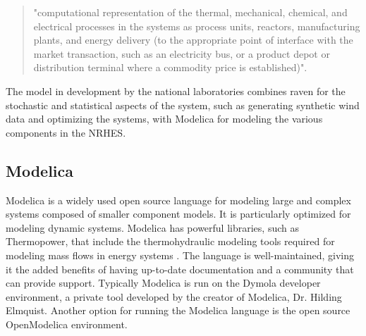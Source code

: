 \documentclass[12pt]{UIdahoMastersThesis}
\begin{document}
\begin{quotation}

"computational representation of the thermal, mechanical, chemical, and electrical processes in the systems as process units, reactors, manufacturing plants, and energy delivery (to the appropriate point of interface with the market transaction, such as an electricity bus, or a product depot or distribution terminal where a commodity price is established)"\cite{Rabiti2015}.
\end{quotation}

The model in development by the national laboratories combines \ac{raven} for the stochastic and statistical aspects of the system, such as generating synthetic wind data and optimizing the systems, with Modelica for modeling the various components in the NRHES.

\subsection{Modelica}
Modelica is a widely used open source language for modeling large and complex systems composed of smaller component models. It is particularly optimized for modeling dynamic systems. Modelica has powerful libraries, such as Thermopower, that include the thermohydraulic modeling tools required for modeling mass flows in energy systems \cite{Binder2014}. The language is well-maintained, giving it the added benefits of having up-to-date documentation and a community that can provide support. Typically Modelica is run on the Dymola developer environment, a private tool developed by the creator of Modelica, Dr. Hilding Elmquist. Another option for running the Modelica language is the open source OpenModelica environment.
\end{document}

